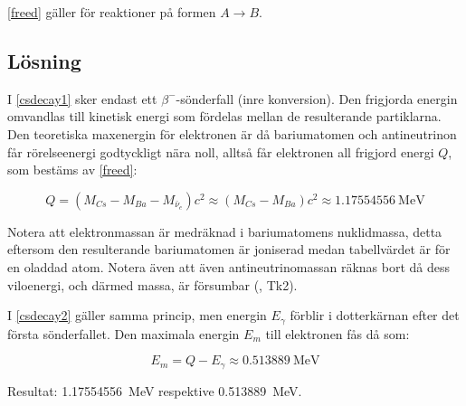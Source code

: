 \eqref{freed} gäller för reaktioner på formen $A \longrightarrow B$.

\subsection*{Lösning}

I \eqref{csdecay1} sker endast ett $\beta^-$-sönderfall (inre konversion). Den
frigjorda energin omvandlas till kinetisk energi som fördelas mellan de
resulterande partiklarna. Den teoretiska maxenergin för elektronen är då
bariumatomen och antineutrinon får rörelseenergi godtyckligt nära noll, alltså
får elektronen all frigjord energi $Q$, som bestäms av \eqref{freed}:

\begin{equation}
    Q = (M_{Cs} - M_{Ba} - M_{\bar{\nu}_e})c^2 \approx (M_{Cs} - M_{Ba})c^2 \approx \qty{1.17554556}{\MeV}
\end{equation}

Notera att elektronmassan är medräknad i bariumatomens nuklidmassa, detta
eftersom den resulterande bariumatomen är joniserad medan tabellvärdet är
för en oladdad atom. Notera även att även antineutrinomassan räknas bort då
dess viloenergi, och därmed massa, är försumbar (\cite{fysika}, Tk2).

I \eqref{csdecay2} gäller samma princip, men energin $E_\gamma$ förblir i
dotterkärnan efter det första sönderfallet. Den maximala energin $E_m$ till
elektronen fås då som:

\begin{equation}
    E_m = Q - E_\gamma \approx \qty{0.513889}{\MeV}
\end{equation}

Resultat: \qty{1.17554556}{\MeV} respektive \qty{0.513889}{\MeV}.
